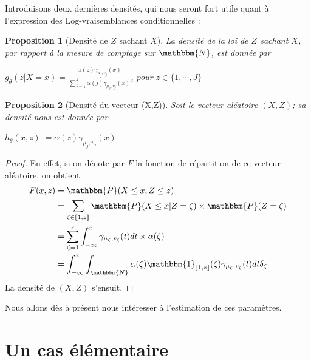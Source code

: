 \documentclass[frenchb]{report}
\newcommand{\N}{\mathbbm{N}}
\newcommand{\1}{\mathbbm{1}}
\newcommand{\prob}{\mathbbm{P}}
\newtheorem{prop}{Proposition}
\theoremstyle{definition}\newtheorem{defn}{Définition}
\theoremstyle{definition}\newtheorem{exm}{Exemple}
\theoremstyle{definition}\newtheorem{nota}{Notation}
\theoremstyle{definition}\newtheorem{rem}{Remarque}
\begin{document}
Introduisons deux dernières densités, qui nous seront fort utile quant à l'expression des Log-vraisemblances conditionnelles :

\begin{prop}[Densité de $Z$ sachant $X$] La densité de la loi de $Z$ sachant $X$, par rapport à la mesure de comptage sur $\N$, est donnée par
\begin{center}
$g_\theta(z | X=x ) = \frac{\displaystyle\alpha(z)\gamma_{\mu_j, v_j}(x)}{\displaystyle\sum_{j=1}^J\alpha(j)\gamma_{\mu_j, v_j}(x)}$, pour $z\in \{1,\cdots,J\}$
\end{center}
\end{prop}


\begin{prop}[Densité du vecteur (X,Z)]
Soit le vecteur aléatoire $(X, Z)$; sa densité nous est donnée par
\begin{center} $h_\theta(x,z) := \alpha(z)\gamma_{\mu_j, v_j}(x)$ \end{center}
\end{prop}

\begin{proof}
En effet, si on dénote par $F$ la fonction de répartition de ce vecteur aléatoire, on obtient
\begin{align*}
F(x, z) &= \prob(X \leq x, Z \leq z)\\
&=\displaystyle\sum_{\zeta \in \llbracket1,z \rrbracket} \prob(X\leq x | Z = \zeta)\times\prob(Z = \zeta)\\
&=\displaystyle\sum_{\zeta = 1}^z \int_{-\infty}^x \gamma_{\mu_\zeta,v_\zeta}(t)dt \times \alpha(\zeta)\\
&= \int_{-\infty}^x \int_\N\alpha(\zeta)\1_{\llbracket 1,z\rrbracket}(\zeta)\gamma_{\mu_\zeta,v_\zeta}(t)dt\delta_\zeta
\end{align*}
La densité de $(X,Z)$ s'ensuit.
\end{proof}

Nous allons dès à présent nous intéresser à l'estimation de ces paramètres.

\section{Un cas élémentaire}
\end{document}

